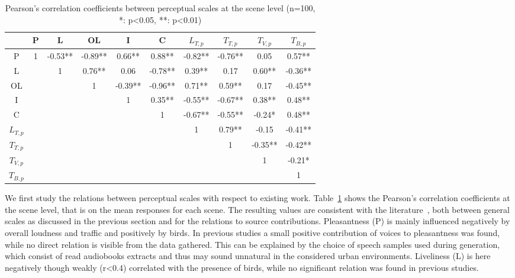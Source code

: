 \documentclass[11pt,a4paper]{article}
\begin{document}
\begin{table}[h]
\centering
\caption{Pearson's correlation coefficients between perceptual scales at the scene level (n=100, *: p<0.05, **: p<0.01)}
\label{tab:percc}
\begin{tabular}{ c | c c c c c c c c c }
\hline
	 & P & L & OL & I & C & $L_{T, p}$ & $T_{T, p}$ & $T_{V, p}$ & $T_{B, p}$ \\ \hline
	P & 1 & -0.53** & -0.89** & 0.66** & 0.88** & -0.82** & -0.76** & 0.05 & 0.57** \\
	L &  & 1 & 0.76** & 0.06 & -0.78** & 0.39** & 0.17 & 0.60** & -0.36** \\
	OL &  &  & 1 & -0.39** & -0.96** & 0.71** & 0.59** & 0.17 & -0.45** \\
	I &  &  &  & 1 & 0.35** & -0.55** & -0.67** & 0.38** & 0.48** \\
	C &  &  &  &  & 1 & -0.67** & -0.55** & -0.24* & 0.48** \\
	$L_{T, p}$ &  &  &  &  &  & 1 & 0.79** & -0.15 & -0.41** \\
	$T_{T, p}$ &  &  &  &  &  &  & 1 & -0.35** & -0.42** \\
	$T_{V, p}$ &  &  &  &  &  &  &  & 1 & -0.21* \\
	$T_{B, p}$ &  &  &  &  &  &  &  &  & 1 \\ \hline
\end{tabular}
\end{table}

We first study the relations between perceptual scales with respect to existing work. Table~\ref{tab:percc} shows the Pearson's correlation coefficients at the scene level, that is on the mean responses for each scene. The resulting values are consistent with the literature~\cite{aumond2017, gontier2018}, both between general scales as discussed in the previous section and for the relations to source contributions. Pleasantness (P) is mainly influenced negatively by overall loudness and traffic and positively by birds. In previous studies a small positive contribution of voices to pleasantness was found, while no direct relation is visible from the data gathered. This can be explained by the choice of speech samples used during generation, which consist of read audiobooks extracts and thus may sound unnatural in the considered urban environments. Liveliness (L) is here negatively though weakly (r<0.4) correlated with the presence of birds, while no significant relation was found in previous studies.\\
\end{document}
